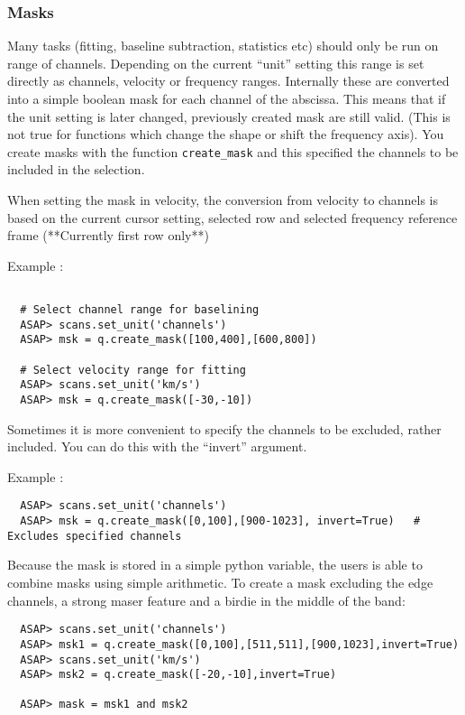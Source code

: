 \documentclass[11pt]{article}
\newcommand{\cmd}[1]{{\tt #1}}
\begin{document}
\subsubsection{Masks}

Many tasks (fitting, baseline subtraction, statistics etc) should only
be run on range of channels. Depending on the current ``unit'' setting
this range is set directly as channels, velocity or frequency
ranges. Internally these are converted into a simple boolean mask for
each channel of the abscissa. This means that if the unit setting is
later changed, previously created mask are still valid. (This is not
true for functions which change the shape or shift the frequency axis).
You create masks with the function \cmd{create\_mask} and this specified
the channels to be included in the selection.

When setting the mask in velocity, the conversion from velocity
to channels is based on the current cursor setting, selected row and
selected frequency reference frame (**Currently first row only**)


Example :
\begin{verbatim}

  # Select channel range for baselining
  ASAP> scans.set_unit('channels')
  ASAP> msk = q.create_mask([100,400],[600,800])
 
  # Select velocity range for fitting
  ASAP> scans.set_unit('km/s')
  ASAP> msk = q.create_mask([-30,-10])
\end{verbatim}


Sometimes it is more convenient to specify the channels to be 
excluded, rather included.  You can do this with the ``invert'' argument.

Example :
\begin{verbatim}
  ASAP> scans.set_unit('channels')
  ASAP> msk = q.create_mask([0,100],[900-1023], invert=True)   # Excludes specified channels
\end{verbatim}

Because the mask is stored in a simple python variable, the users is
able to combine masks using simple arithmetic. To create a mask
excluding the edge channels, a strong maser feature and a birdie in
the middle of the band:

\begin{verbatim}
  ASAP> scans.set_unit('channels')
  ASAP> msk1 = q.create_mask([0,100],[511,511],[900,1023],invert=True)
  ASAP> scans.set_unit('km/s')
  ASAP> msk2 = q.create_mask([-20,-10],invert=True)

  ASAP> mask = msk1 and msk2
\end{verbatim}
\end{document}
